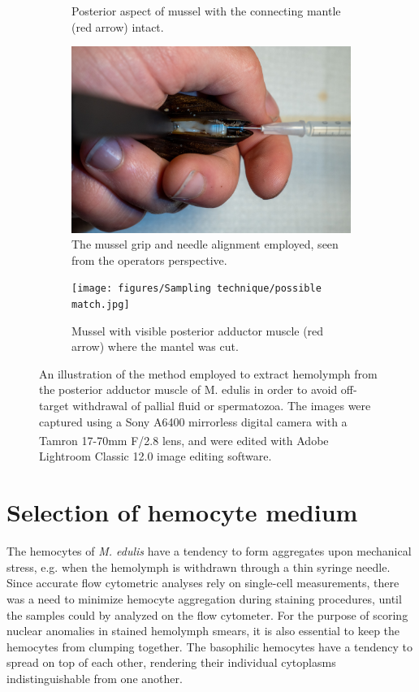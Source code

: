 \begin{figure}[t]
\begin{subfigure}[b]{.45\textwidth}
        \caption{Posterior aspect of mussel with the connecting mantle (red arrow) intact.}
        \label{sfig:b}
    \end{subfigure}
    \newline
    \begin{subfigure}[b]{.45\textwidth}
        \centering
        \includegraphics[width=\textwidth]{figures/Sampling technique/hands colors centered.jpg}
        \caption{The mussel grip and needle alignment employed, seen from the operators perspective. }
        \label{sfig:c}
    \end{subfigure}
    \hfill
    \begin{subfigure}[b]{.45\textwidth}
        \centering
        \texttt{[image: figures/Sampling technique/possible match.jpg]}
        \caption{Mussel with visible posterior adductor muscle (red arrow) where the mantel was cut.}
        \label{sfig:d}
    \end{subfigure}
    \caption{An illustration of the method employed to extract hemolymph from the posterior adductor muscle of M. edulis in order to avoid off-target withdrawal of pallial fluid or spermatozoa. The images were captured using a Sony A6400 mirrorless digital camera with a Tamron 17-70mm F/2.8 lens, and were edited with Adobe\textsuperscript{\textregistered} Lightroom Classic 12.0 image editing software.}
    \label{fig:Hemolymph_sampling_illustration}
\end{figure}

\section{Selection of hemocyte medium}
The hemocytes of \emph{M. edulis} have a tendency to form aggregates upon mechanical stress, e.g. when the hemolymph is withdrawn through a thin syringe needle. Since accurate flow cytometric analyses rely on single-cell measurements, there was a need to minimize hemocyte aggregation during staining procedures, until the samples could by analyzed on the flow cytometer. For the purpose of scoring nuclear anomalies in stained hemolymph smears, it is also essential to keep the hemocytes from clumping together. The basophilic hemocytes have a tendency to spread on top of each other, rendering their individual cytoplasms indistinguishable from one another.

